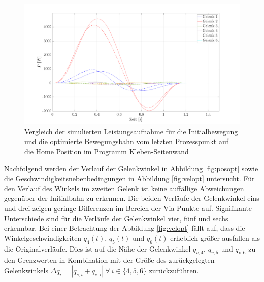\begin{figure}[tbph]
	\centering
	\includegraphics[width=1\linewidth]{images/Optimierungsergebnisse_up/popt}
	\caption{Vergleich der simulierten Leistungsaufnahme für die Initialbewegung und die optimierte Bewegungsbahn  vom letzten Prozesspunkt auf die  Home Position im Programm Kleben-Seitenwand}
	\label{fig:popt}
\end{figure}

Nachfolgend werden der Verlauf der Gelenkwinkel in Abbildung \ref{fig:posopt} sowie die Geschwindigkeitsnebenbedingungen in Abbildung \ref{fig:velopt} untersucht. Für den Verlauf des Winkels im zweiten Gelenk ist keine auffällige Abweichungen gegenüber der Initialbahn zu erkennen. Die beiden Verläufe der Gelenkwinkel eins und drei zeigen geringe Differenzen im Bereich der Via-Punkte auf. Signifikante Unterschiede sind für die Verläufe der Gelenkwinkel vier, fünf und sechs erkennbar.  Bei einer Betrachtung der Abbildung \ref{fig:velopt} fällt auf, dass die Winkelgeschwindigkeiten $\dot{q}_{4}(t)$, $\dot{q}_{5}(t)$ und $\dot{q}_{6}(t)$ erheblich größer ausfallen als die Originalverläufe. Dies ist auf die Nähe der Gelenkwinkel ${q}_{v,4}$, ${q}_{v,5}$ und ${q}_{v,6}$ zu den Grenzwerten in Kombination mit der Größe des zurückgelegten Gelenkwinkels $\Delta q_i = | q_{s,i}+q_{e,i} | ~\forall~ i \in \{4,5,6\}$ zurückzuführen. 

